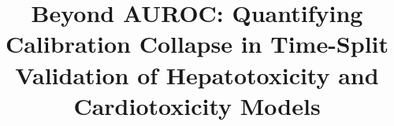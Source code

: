 

\title[Calibration collapse in time-split validation]{Beyond AUROC: Quantifying
Calibration Collapse in Time-Split Validation of Hepatotoxicity and
Cardiotoxicity Models}


\author*[1]{\fnm{[이름]} \sur{[성]}}\email{[이메일]}

\affil*[1]{\orgdiv{[학과]}, \orgname{[기관]}, \orgaddress{\city{[도시]}, \country{[국가]}}}



